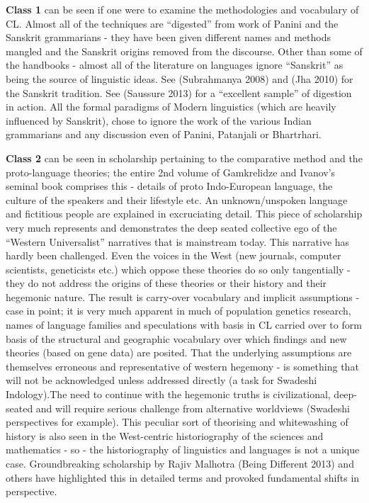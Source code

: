 \textbf{Class 1} can be seen if one were to examine the methodologies and vocabulary of CL. Almost all of the techniques are “digested” from work of Panini and the Sanskrit grammarians - they have been given different names and methods mangled and the Sanskrit origins removed from the discourse. Other than some of the handbooks - almost all of the literature on languages ignore “Sanskrit” as being the source of linguistic ideas. See (Subrahmanya 2008) and (Jha 2010) for the Sanskrit tradition. See (Saussure 2013) for a “excellent sample” of digestion in action. All the formal paradigms of Modern linguistics (which are heavily influenced by Sanskrit), chose to ignore the work of the various Indian grammarians and any discussion even of Panini, Patanjali or Bhartrhari.

\textbf{Class 2} can be seen in scholarship pertaining to the comparative method and the proto-language theories; the entire 2nd volume of Gamkrelidze and Ivanov’s seminal book comprises this - details of proto Indo-European language, the culture of the speakers and their lifestyle etc. An unknown/unspoken language and fictitious people are explained in excruciating detail. This piece of scholarship very much represents and demonstrates the deep seated collective ego of the “Western Universalist” narratives that is mainstream today. This narrative has hardly been challenged. Even the voices in the West (new journals, computer scientists, geneticists etc.) which oppose these theories do so only tangentially - they do not address the origins of these theories or their history and their hegemonic nature. The result is carry-over vocabulary and implicit assumptions - case in point; it is very much apparent in much of population genetics research, names of language families and speculations with basis in CL carried over to form basis of the structural and geographic vocabulary over which findings and new theories (based on gene data) are posited. That the underlying assumptions are themselves erroneous and representative of western hegemony - is something that will not be acknowledged unless addressed directly (a task for Swadeshi Indology).The need to continue with the hegemonic truths is civilizational, deep-seated and will require serious challenge from alternative worldviews (Swadeshi perspectives for example). This peculiar sort of theorising and whitewashing of history is also seen in the West-centric historiography of the sciences and mathematics - so - the historiography of linguistics and languages is not a unique case. Groundbreaking scholarship by Rajiv Malhotra (Being Different 2013) and others have highlighted this in detailed terms and provoked fundamental shifts in perspective.

